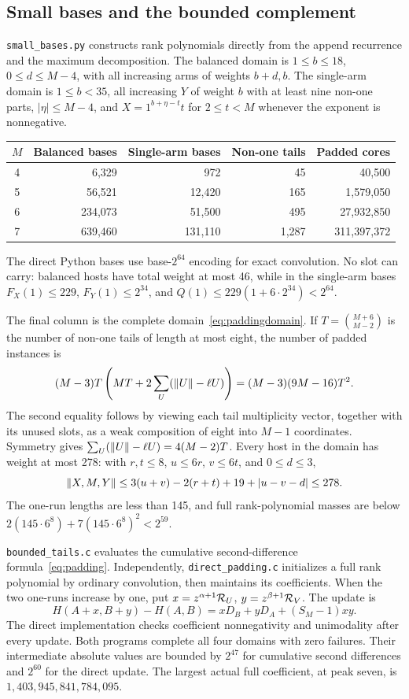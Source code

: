 \subsection{Small bases and the bounded complement}
\texttt{small\_bases.py} constructs rank polynomials directly from the append recurrence and the maximum decomposition. The balanced domain is $1\le b\le18$, $0\le d\le M-4$, with all increasing arms of weights $b+d,b$. The single-arm domain is $1\le b<35$, all increasing $Y$ of weight $b$ with at least nine non-one parts, $|\eta|\le M-4$, and $X=1^{b+\eta-t}t$ for $2\le t<M$ whenever the exponent is nonnegative.
\begin{center}
\begin{tabular}{crrrr}\toprule
$M$ & Balanced bases & Single-arm bases & Non-one tails & Padded cores\\\midrule
4&6,329&972&45&40,500\\
5&56,521&12,420&165&1,579,050\\
6&234,073&51,500&495&27,932,850\\
7&639,460&131,110&1,287&311,397,372\\\bottomrule
\end{tabular}
\end{center}
The direct Python bases use base-$2^{64}$ encoding for exact convolution. No slot can carry: balanced hosts have total weight at most 46, while in the single-arm bases $F_X(1)\le229$, $F_Y(1)\le2^{34}$, and $Q(1)\le229(1+6\cdot2^{34})<2^{64}$.

The final column is the complete domain~\eqref{eq:paddingdomain}. If $T=\binom{M+6}{M-2}$ is the number of non-one tails of length at most eight, the number of padded instances is
\[
 (M-3)T\left(MT+2\sum_U(\lVert U\rVert-\ell U)\right)
 =(M-3)(9M-16)T^2.
\]
The second equality follows by viewing each tail multiplicity vector, together with its unused slots, as a weak composition of eight into $M-1$ coordinates. Symmetry gives $\sum_U(\lVert U\rVert-\ell U)=4(M-2)T$.
Every host in the domain has weight at most 278: with $r,t\le8$, $u\le6r$, $v\le6t$, and $0\le d\le3$,
\[
 \lVert X,M,Y\rVert\le3(u+v)-2(r+t)+19+|u-v-d|\le278.
\]
The one-run lengths are less than 145, and full rank-polynomial masses are below $2(145\cdot6^8)+7(145\cdot6^8)^2<2^{59}$.

\texttt{bounded\_tails.c} evaluates the cumulative second-difference formula~\eqref{eq:padding}. Independently, \texttt{direct\_padding.c} initializes a full rank polynomial by ordinary convolution, then maintains its coefficients. When the two one-runs increase by one, put $x=z^{\alpha+1}\mathcal R_U$, $y=z^{\beta+1}\mathcal R_V$. The update is
\[
 H(A+x,B+y)-H(A,B)=xD_B+yD_A+(S_M-1)xy.
\]
The direct implementation checks coefficient nonnegativity and unimodality after every update. Both programs complete all four domains with zero failures. Their intermediate absolute values are bounded by $2^{47}$ for cumulative second differences and $2^{60}$ for the direct update. The largest actual full coefficient, at peak seven, is $1,403,945,841,784,095$.

